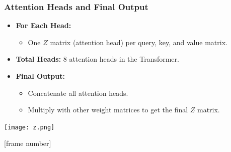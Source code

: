 \documentclass{beamer}
\begin{document}
\begin{frame}
  \frametitle{Attention Heads and Final Output}

  \begin{itemize}
    \item \textbf{For Each Head:}
      \begin{itemize}
        \item One $Z$ matrix (attention head) per query, key, and value matrix.
      \end{itemize}
    \item \textbf{Total Heads:} 8 attention heads in the Transformer.
    \item \textbf{Final Output:} 
      \begin{itemize}
        \item Concatenate all attention heads.
        \item Multiply with other weight matrices to get the final $Z$ matrix.
      \end{itemize}
  \end{itemize}
\pause
  \vspace{.01cm}

  \begin{center}
    \texttt{[image: z.png]} %
  \end{center}

\end{frame}





[frame number]
\end{document}
